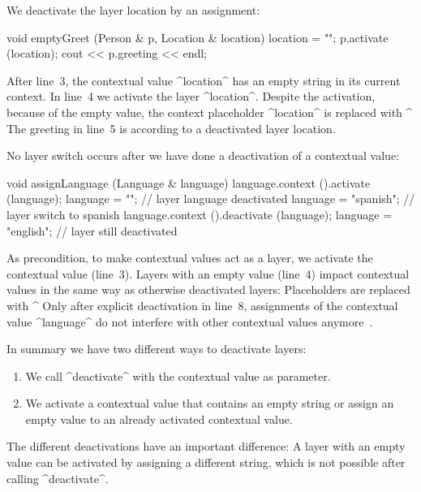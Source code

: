 \begin{example}
We deactivate the layer location by an assignment:

\begin{code}[language=Cpp]
void emptyGreet (Person & p, Location & location)
{
	location = "";
	p.activate (location);
	cout << p.greeting << endl;
}
\end{code}

After line~3, the contextual value ^location^ has an empty string in its current context.
In line~4 we activate the layer ^location^.
Despite the activation, because of the empty value, the context placeholder ^location^ is replaced with ^%
The greeting in line~5 is according to a deactivated layer location.
\end{example}


\begin{example}
No layer switch occurs after we have done a deactivation of a contextual value:

\begin{code}[language=Cpp]
void assignLanguage (Language & language)
{
	language.context ().activate (language);
	language = "";
	// layer language deactivated
	language = "spanish";
	// layer switch to spanish
	language.context ().deactivate (language);
	language = "english";
	// layer still deactivated
}
\end{code}

As precondition, to make contextual values act as a layer, we activate the contextual value (line~3).
Layers with an empty value (line~4) impact contextual values in the same way as otherwise deactivated layers:
Placeholders are replaced with ^%
Only after explicit deactivation in line~8, assignments of the contextual value ^language^ do not interfere with other contextual values anymore~\cite{raab2016persistent}.
\end{example}

In summary we have two different ways to deactivate layers:
\begin{enumerate}
\item We call ^deactivate^ with the contextual value as parameter.
\item We activate a contextual value that contains an empty string or assign an empty value to an already activated contextual value.
\end{enumerate}

The different deactivations have an important difference:
A layer with an empty value can be activated by assigning a different string, which is not possible after calling ^deactivate^.



